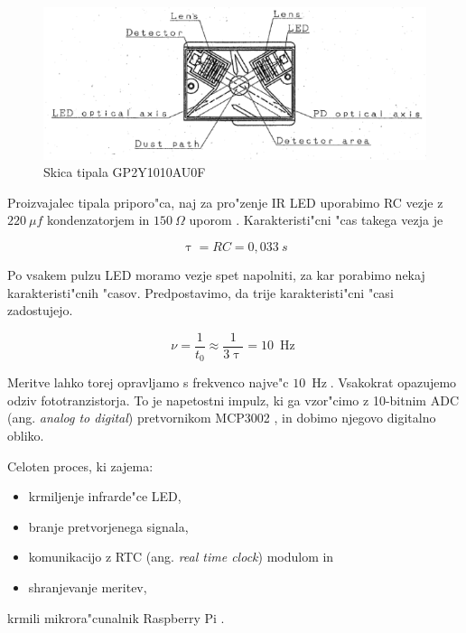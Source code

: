 \documentclass[11pt,a4paper]{article}
\DeclareMathOperator{\Hz}{Hz}
\begin{document}
\begin{figure}[H]
	\begin{center}
		\includegraphics[width=12cm]{sensor-scheme.png}
		\caption{Skica tipala GP2Y1010AU0F}
		\label{sensor-scheme}
	\end{center}
\end{figure}

Proizvajalec tipala priporo"ca, naj za pro"zenje IR LED uporabimo RC vezje z $220\ \mu f $ kondenzatorjem in $150\ \Omega $ uporom \cite{sharp-gp2y1010au0f}. Karakteristi"cni "cas takega vezja je

$$
\uptau = RC = 0,033\ s
$$

Po vsakem pulzu LED moramo vezje spet napolniti, za kar porabimo nekaj karakteristi"cnih "casov. Predpostavimo, da trije karakteristi"cni "casi zadostujejo.

$$
\nu = \frac{1}{t_0} \approx \frac{1}{3 \uptau} = 10\ \Hz
$$

Meritve lahko torej opravljamo s frekvenco najve"c $ 10\ \Hz $. Vsakokrat opazujemo odziv fototranzistorja. To je napetostni impulz, ki ga vzor"cimo z 10-bitnim ADC (ang. \textit{analog to digital}) pretvornikom MCP3002 \cite{mcp3002}, in dobimo njegovo digitalno obliko.

Celoten proces, ki zajema:
\begin{itemize}
	\item krmiljenje infrarde"ce LED,
	\item branje pretvorjenega signala,
	\item komunikacijo z RTC (ang. \textit{real time clock}) modulom in
	\item shranjevanje meritev,
\end{itemize}

krmili mikrora"cunalnik Raspberry Pi \cite{rbpi-wiki}.
\end{document}
